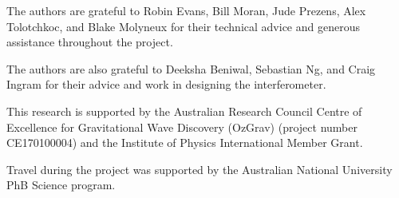 \documentclass[prb,preprint]{revtex4-1}
\begin{document}
\begin{acknowledgments}
The authors are grateful to Robin Evans, Bill Moran, Jude Prezens, Alex Tolotchkoc, and Blake Molyneux for their technical advice and generous assistance throughout the project.
	
The authors are also grateful to Deeksha Beniwal, Sebastian Ng, and Craig Ingram for their advice and work in designing the interferometer. 

This research is supported by the Australian Research Council Centre of Excellence for Gravitational Wave Discovery (OzGrav) (project number CE170100004) and the Institute of Physics International Member Grant.

Travel during the project was supported by the Australian National University PhB Science  program.

\end{acknowledgments}




\end{document}
